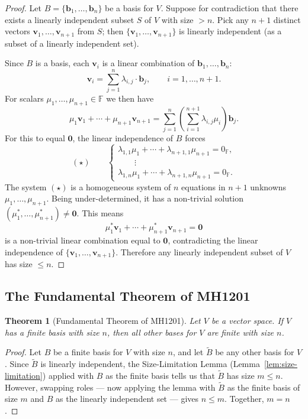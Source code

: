 \documentclass[11pt, a4paper, notitlepage]{report}
\newtheorem{theorem}{Theorem}[section]
\theoremstyle{definition}
\theoremstyle{remark}
\begin{document}
\begin{proof}
Let $B = \{\mathbf{b}_1, \ldots, \mathbf{b}_n\}$ be a basis for $V$. Suppose for contradiction that there exists a linearly independent subset $S$ of $V$ with size $> n$. Pick any $n+1$ distinct vectors $\mathbf{v}_1, \ldots, \mathbf{v}_{n+1}$ from $S$; then $\{\mathbf{v}_1, \ldots, \mathbf{v}_{n+1}\}$ is linearly independent (as a subset of a linearly independent set).

Since $B$ is a basis, each $\mathbf{v}_i$ is a linear combination of $\mathbf{b}_1, \ldots, \mathbf{b}_n$:
\[
  \mathbf{v}_i = \sum_{j=1}^n \lambda_{i,j}\cdot\mathbf{b}_j, \qquad i = 1,\ldots, n+1.
\]
For scalars $\mu_1, \ldots, \mu_{n+1}\in\mathbb{F}$ we then have
\[
  \mu_1\mathbf{v}_1 + \cdots + \mu_{n+1}\mathbf{v}_{n+1}
  = \sum_{j=1}^n \left(\sum_{i=1}^{n+1}\lambda_{i,j}\mu_i\right)\mathbf{b}_j.
\]
For this to equal $\mathbf{0}$, the linear independence of $B$ forces
\[
(\star)\qquad
\begin{cases}
  \lambda_{1,1}\mu_1 + \cdots + \lambda_{n+1,1}\mu_{n+1} = 0_\mathbb{F}, \\
  \qquad\vdots\\
  \lambda_{1,n}\mu_1 + \cdots + \lambda_{n+1,n}\mu_{n+1} = 0_\mathbb{F}.
\end{cases}
\]
The system $(\star)$ is a homogeneous system of $n$ equations in $n+1$ unknowns $\mu_1, \ldots, \mu_{n+1}$. Being under-determined, it has a non-trivial solution $(\mu_1^*, \ldots, \mu_{n+1}^*)\neq\mathbf{0}$. This means
\[
  \mu_1^*\mathbf{v}_1 + \cdots + \mu_{n+1}^*\mathbf{v}_{n+1} = \mathbf{0}
\]
is a non-trivial linear combination equal to $\mathbf{0}$, contradicting the linear independence of $\{\mathbf{v}_1, \ldots, \mathbf{v}_{n+1}\}$. Therefore any linearly independent subset of $V$ has size $\leq n$.
\end{proof}

\subsection{The Fundamental Theorem of MH1201}

\begin{theorem}[Fundamental Theorem of MH1201]\label{thm:fund-thm-mh1201}
Let $V$ be a vector space. If $V$ has a finite basis with size $n$, then all other bases for $V$ are finite with size $n$.
\end{theorem}

\begin{proof}
Let $B$ be a finite basis for $V$ with size $n$, and let $\tilde{B}$ be any other basis for $V$. Since $\tilde{B}$ is linearly independent, the Size-Limitation Lemma (Lemma~\ref{lem:size-limitation}) applied with $B$ as the finite basis tells us that $\tilde{B}$ has size $m \leq n$. However, swapping roles — now applying the lemma with $\tilde{B}$ as the finite basis of size $m$ and $B$ as the linearly independent set — gives $n \leq m$. Together, $m = n$.
\end{proof}
\end{document}

